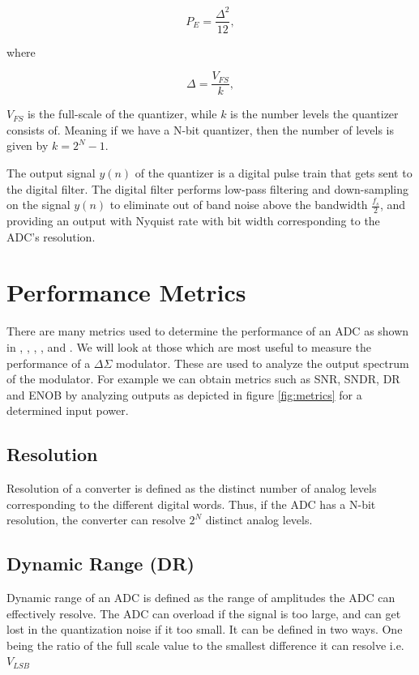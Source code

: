 \begin{equation}
    P_E = \frac{\Delta^2}{12},
\end{equation}

where 

\begin{equation}
    \Delta = \frac{V_{FS}}{k},
\end{equation}

$V_{FS}$ is the full-scale of the quantizer, while $k$ is the number levels the quantizer consists of. Meaning if we have a N-bit quantizer, then the number of levels is given by $k = 2^N - 1$. 

The output signal $y(n)$ of the quantizer is a digital pulse train that gets sent to the digital filter. The digital filter performs low-pass filtering and down-sampling on the signal $y(n)$ to eliminate out of band noise above the bandwidth $\frac{f_s}{2}$, and providing an output with Nyquist rate with bit width corresponding to the ADC's resolution. 

\section{Performance Metrics}

There are many metrics used to determine the performance of an ADC as shown in \cite{Allen}, \cite{Johns}, \cite{Razavi}, \cite{Barker}, \cite{Malo} and \cite{Plass}. We will look at those which are most useful to measure the performance of a $\Delta\Sigma$ modulator. These are used to analyze the output spectrum of the modulator. For example we can obtain metrics such as SNR, SNDR, DR and ENOB by analyzing outputs as depicted in figure \ref{fig:metrics} for a determined input power. 

\subsection{Resolution}
Resolution of a converter is defined as the distinct number of analog levels corresponding to the different digital words. Thus, if the ADC has a N-bit resolution, the converter can resolve $2^N$ distinct analog levels.

\subsection{Dynamic Range (DR)}
Dynamic range of an ADC is defined as the range of amplitudes the ADC can effectively resolve. The ADC can overload if the signal is too large, and can get lost in the quantization noise if it too small. It can be defined in two ways. One being the ratio of the full scale value to the smallest difference it can resolve i.e. $V_{LSB}$

